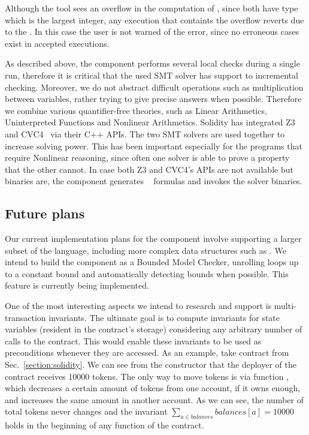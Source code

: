 Although the tool sees an overflow in the computation of , since
both have type  which is the largest integer, any execution that
containts the overflow reverts due to the .
%
In this case the user is not warned of the error, since no erroneous cases
exist in accepted executions.

As described above, the component performs several local checks during a single
run, therefore it is critical that the used SMT solver has support to
incremental checking.
%
Moreover, we do not abstract difficult operations such as multiplication
between variables, rather trying to give precise answers when possible.
%
Therefore we combine various quantifier-free theories, such as Linear
Arithmetics, Uninterpreted Functions and Nonlinear Arithmetics. 
%
Solidity has integrated Z3~\cite{Z3} and CVC4~\cite{CVC4} via their C++ APIs.
%
The two SMT solvers are used together to increase solving power.
%
This has been important especially for the programs that require Nonlinear
reasoning, since often one solver is able to prove a property that the other
cannot.
%
In case both Z3 and CVC4's APIs are not available but binaries are, the
component generates ~\cite{SMTLIB} formulas and invokes the
solver binaries.


\subsection{Future plans}

Our current implementation plans for the component involve supporting
a larger subset of the language, including more complex data structures
such as .
%
We intend to build the component as a Bounded Model Checker, unrolling loops
up to a constant bound and automatically detecting bounds when possible.
%
This feature is currently being implemented.

One of the most interesting aspects we intend to research and support is
multi-transaction invariants.
%
The ultimate goal is to compute invariants for state variables (resident in the
contract's storage) considering any arbitrary number of calls to the contract.
%
This would enable these invariants to be used as preconditions whenever they
are accessed.
%
As an example, take contract  from Sec.~\ref{section:solidity}.
%
We can see from the constructor that the deployer of the contract receives
10000 tokens.
%
The only way to move tokens is via function , which decreases a
certain amount of tokens from one account, if it owns enough, and increases the
same amount in another account.
%
As we can see, the number of total tokens never changes and the invariant
$\sum_{a \in balances} balances[a] = 10000$ holds in the beginning of any
function of the contract.

